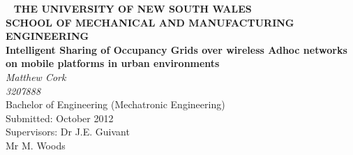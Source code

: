 \begin{center} ~
\thispagestyle{empty}
\textbf{\large THE UNIVERSITY OF NEW SOUTH WALES} \\[1ex]
\textbf{\large SCHOOL OF MECHANICAL AND MANUFACTURING ENGINEERING} \\[2cm]
\textbf{\Huge Intelligent Sharing of Occupancy Grids over wireless Adhoc networks on mobile platforms in urban environments} \\[2cm]
\textit{\huge Matthew Cork} \\[1cm]
\textit{\huge 3207888}\\[1cm]
{\Large
Bachelor of Engineering (Mechatronic Engineering) \\[2ex]
Submitted: October 2012 \\[2ex]
Supervisors: Dr J.E. Guivant\\
Mr M. Woods
}
\end{center}
